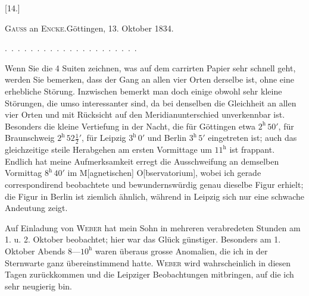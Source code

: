 \clearpage\begingroup{}
\begin{center}[14.]\end{center}
\begin{center}\textsc{Gauss} an \textsc{Encke}.\quad Göttingen, 13. Oktober 1834.\end{center}
\noindent .\ .\ .\ .\ .\ .\ .\ .\ .\ .\ .\ .\ .\ .\ .\ .\ .\ .\ .\ .\ .
\par\noindent\hspace*{\parindent}Wenn Sie die 4 Suiten zeichnen, was auf dem carrirten Papier sehr schnell
geht, werden Sie bemerken, dass der Gang an allen vier Orten derselbe ist,
ohne eine erhebliche Störung. Inzwischen bemerkt man doch einige obwohl
sehr kleine Störungen, die umso interessanter sind, da bei denselben die
Gleichheit an allen vier Orten und mit Rücksicht auf den Meridianunterschied
unverkennbar ist. Besonders die kleine Vertiefung in der Nacht, die für
Göttingen etwa \(2^{\mathrm h}\,50'\), für Braunschweig \(2^{\mathrm h}\,52\frac{1}{2}'\), für Leipzig \(3^{\mathrm h}\,0'\) und Berlin
\(3^{\mathrm h}\,5'\) eingetreten ist; auch das gleichzeitige steile Herabgehen am ersten Vormittage
um \(11^{\mathrm h}\) ist frappant. Endlich hat meine Aufmerksamkeit erregt die
\clearpage{}
\noindent Ausschweifung an demselben Vormittag \(8^{\mathrm h}\,40'\) im M[agnetischen] O[bservatorium],
wobei ich gerade correspondirend beobachtete und bewundernswürdig
genau dieselbe Figur erhielt; die Figur in Berlin ist ziemlich ähnlich, während
in Leipzig sich nur eine schwache Andeutung zeigt.

Auf Einladung von \textsc{Weber} hat mein Sohn in mehreren verabredeten
Stunden am 1. u. 2. Oktober beobachtet; hier war das Glück günstiger. Besonders
am 1. Oktober Abends \(8\text{---}10^{\mathrm h}\) waren überaus grosse Anomalien, die
ich in der Sternwarte ganz übereinstimmend hatte. \textsc{Weber} wird wahrscheinlich
in diesen Tagen zurückkommen und die Leipziger Beobachtungen mitbringen,
auf die ich sehr neugierig bin.

